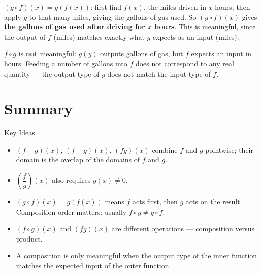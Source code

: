 \documentclass[12pt]{article}
\begin{document}
 

\begin{solutionbox}
$(g\circ f)(x)=g(f(x))$: first find $f(x)$, the miles driven in $x$ hours; then apply $g$ to that many miles, giving the gallons of gas used. So $(g\circ f)(x)$ gives \textbf{the gallons of gas used after driving for $x$ hours}. This is meaningful, since the output of $f$ (miles) matches exactly what $g$ expects as an input (miles).

$f\circ g$ is \textbf{not} meaningful: $g(y)$ outputs gallons of gas, but $f$ expects an input in hours. Feeding a number of gallons into $f$ does not correspond to any real quantity --- the output type of $g$ does not match the input type of $f$.
\end{solutionbox}

  

\section*{Summary}

\begin{friendlyrule}{Key Ideas}
\begin{itemize}
    \item $(f+g)(x)$, $(f-g)(x)$, $(fg)(x)$ combine $f$ and $g$ pointwise; their domain is the overlap of the domains of $f$ and $g$.
    \item $\left(\dfrac{f}{g}\right)(x)$ also requires $g(x)\neq 0$.
    \item $(g\circ f)(x)=g(f(x))$ means $f$ acts first, then $g$ acts on the result. Composition order matters: usually $f\circ g\neq g\circ f$.
    \item $(f\circ g)(x)$ and $(fg)(x)$ are different operations --- composition versus product.
    \item A composition is only meaningful when the output type of the inner function matches the expected input of the outer function.
\end{itemize}
\end{friendlyrule}
\end{document}
